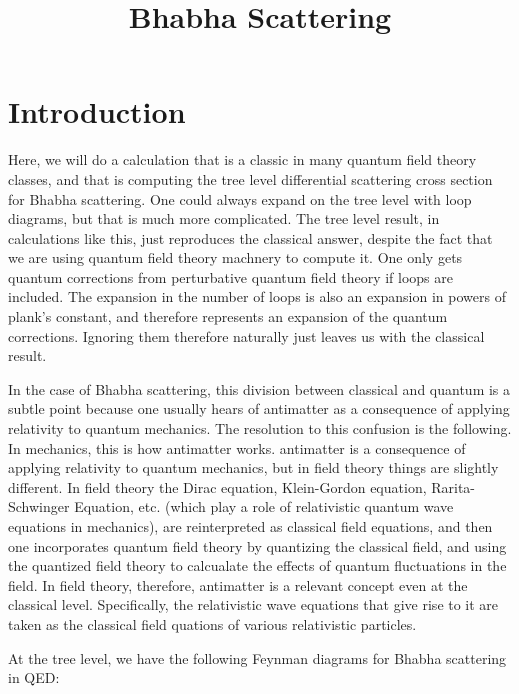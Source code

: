 \documentclass[a4]{article}
\begin{document}
    \title{Bhabha Scattering}
    \maketitle

    \section*{Introduction}

    Here, we will do a calculation that is a classic in many quantum field theory classes, and that is computing the tree level differential scattering cross section for Bhabha scattering.
    One could always expand on the tree level with loop diagrams, but that is much more complicated. The tree level result, in calculations like this, just reproduces the classical answer,
    despite the fact that we are using quantum field theory machnery to compute it. One only gets quantum corrections from perturbative quantum field theory if loops are included. The 
    expansion in the number of loops is also an expansion in powers of plank's constant, and therefore represents an expansion of the quantum corrections. Ignoring them therefore naturally
    just leaves us with the classical result. 

    In the case of Bhabha scattering, this division between classical and quantum is a subtle point because one usually hears of antimatter as a consequence of applying relativity to quantum 
    mechanics. The resolution to this confusion is the following. In mechanics, this is how antimatter works. antimatter is a consequence of applying relativity to quantum mechanics, but in
    field theory things are slightly different. In field theory the Dirac equation, Klein-Gordon equation, Rarita-Schwinger Equation, etc. (which play a role of relativistic quantum wave 
    equations in mechanics), are reinterpreted as classical field equations, and then one incorporates quantum field theory by quantizing the classical field, and using the quantized field
    theory to calcualate the effects of quantum fluctuations in the field. In field theory, therefore, antimatter is a relevant concept even at the classical level. Specifically, the 
    relativistic wave equations that give rise to it are taken as the classical field quations of various relativistic particles. 

    At the tree level, we have the following Feynman diagrams for Bhabha scattering in QED:
\end{document}

